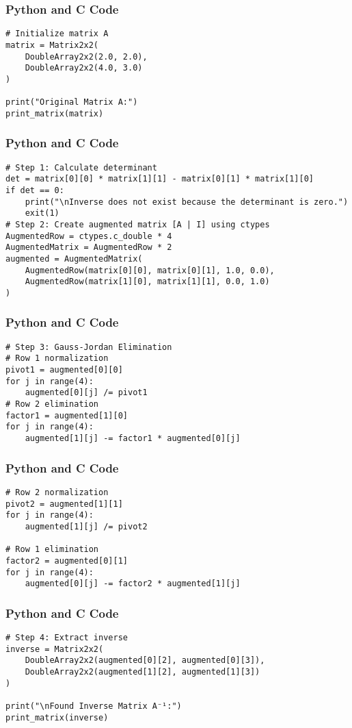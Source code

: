 \documentclass{beamer}
\begin{document}
\begin{frame}[fragile]
\frametitle{Python and C Code}
\begin{lstlisting}
# Initialize matrix A
matrix = Matrix2x2(
    DoubleArray2x2(2.0, 2.0),
    DoubleArray2x2(4.0, 3.0)
)

print("Original Matrix A:")
print_matrix(matrix)
\end{lstlisting}
\end{frame}

\begin{frame}[fragile]
\frametitle{Python and C Code}
\begin{lstlisting}
# Step 1: Calculate determinant
det = matrix[0][0] * matrix[1][1] - matrix[0][1] * matrix[1][0]
if det == 0:
    print("\nInverse does not exist because the determinant is zero.")
    exit(1)
# Step 2: Create augmented matrix [A | I] using ctypes
AugmentedRow = ctypes.c_double * 4
AugmentedMatrix = AugmentedRow * 2
augmented = AugmentedMatrix(
    AugmentedRow(matrix[0][0], matrix[0][1], 1.0, 0.0),
    AugmentedRow(matrix[1][0], matrix[1][1], 0.0, 1.0)
)
\end{lstlisting}
\end{frame}

\begin{frame}[fragile]
\frametitle{Python and C Code}
\begin{lstlisting}
# Step 3: Gauss-Jordan Elimination
# Row 1 normalization
pivot1 = augmented[0][0]
for j in range(4):
    augmented[0][j] /= pivot1
# Row 2 elimination
factor1 = augmented[1][0]
for j in range(4):
    augmented[1][j] -= factor1 * augmented[0][j]
\end{lstlisting}
\end{frame}

\begin{frame}[fragile]
\frametitle{Python and C Code}
\begin{lstlisting}
# Row 2 normalization
pivot2 = augmented[1][1]
for j in range(4):
    augmented[1][j] /= pivot2

# Row 1 elimination
factor2 = augmented[0][1]
for j in range(4):
    augmented[0][j] -= factor2 * augmented[1][j]
\end{lstlisting}
\end{frame}

\begin{frame}[fragile]
\frametitle{Python and C Code}
\begin{lstlisting}
# Step 4: Extract inverse
inverse = Matrix2x2(
    DoubleArray2x2(augmented[0][2], augmented[0][3]),
    DoubleArray2x2(augmented[1][2], augmented[1][3])
)

print("\nFound Inverse Matrix A⁻¹:")
print_matrix(inverse)

\end{lstlisting}
\end{frame}
\end{document}
